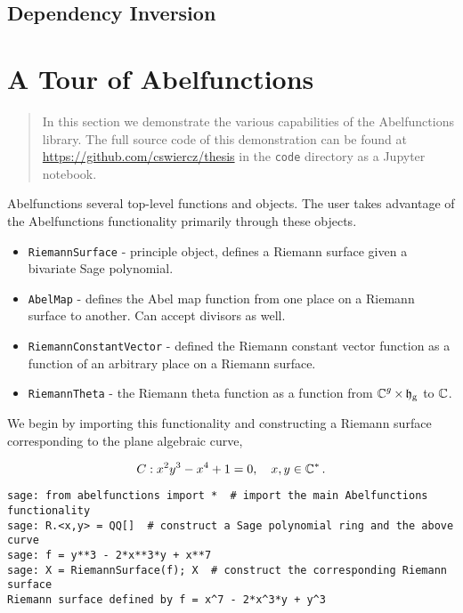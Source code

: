 \subsection{Dependency Inversion}


\section{A Tour of Abelfunctions}\label{sec:abelfunctions-a-tour-of-abelfunctions}

\begin{quote}
  In this section we demonstrate the various capabilities of the Abelfunctions
  library. The full source code of this demonstration can be found at
  \url{https://github.com/cswiercz/thesis} in the {\tt code} directory as a
  Jupyter notebook.
\end{quote}

Abelfunctions several top-level functions and objects. The user takes advantage
of the Abelfunctions functionality primarily through these objects.
\begin{itemize}
  \item {\tt RiemannSurface} - principle object, defines a Riemann surface given
    a bivariate Sage polynomial.
  \item {\tt AbelMap} - defines the Abel map function from one place on a
    Riemann surface to another. Can accept divisors as well.
  \item {\tt RiemannConstantVector} - defined the Riemann constant vector
    function as a function of an arbitrary place on a Riemann surface.
  \item {\tt RiemannTheta} - the Riemann theta function as a function from
    $\operatorname{\mathbb{C}}^g \times \operatorname{\mathfrak{h}_g}$ to $\operatorname{\mathbb{C}}$.
\end{itemize}

\noindent We begin by importing this functionality and constructing a Riemann
surface corresponding to the plane algebraic curve,

\[
  C : x^2y^3 - x^4 + 1 = 0, \quad x,y \in \operatorname{\mathbb{C}}^*.
\]

\begin{lstlisting}[language=Sage]
sage: from abelfunctions import *  # import the main Abelfunctions functionality
sage: R.<x,y> = QQ[]  # construct a Sage polynomial ring and the above curve
sage: f = y**3 - 2*x**3*y + x**7
sage: X = RiemannSurface(f); X  # construct the corresponding Riemann surface
Riemann surface defined by f = x^7 - 2*x^3*y + y^3
\end{lstlisting}

